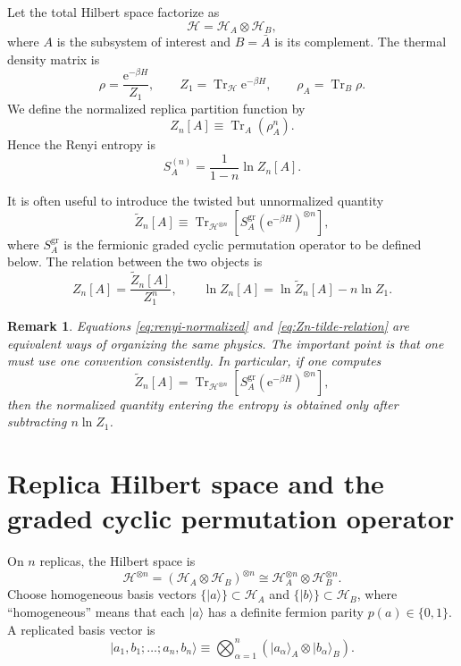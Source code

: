 \documentclass[11pt]{article}
\newtheorem{remark}{Remark}
\newcommand{\Tr}{\operatorname{Tr}}
\newcommand{\e}{\mathrm{e}}
\newcommand{\1}{\mathds{1}}
\newcommand{\HA}{\mathcal{H}_A}
\newcommand{\HB}{\mathcal{H}_B}
\newcommand{\HH}{\mathcal{H}}
\newcommand{\br}[1]{\left(#1\right)}
\newcommand{\sq}[1]{\left[#1\right]}
\begin{document}
Let the total Hilbert space factorize as
\begin{equation}
\HH=\HA\otimes \HB,
\label{eq:Hfactor}
\end{equation}
where $A$ is the subsystem of interest and $B=\bar A$ is its complement. The
thermal density matrix is
\begin{equation}
\rho=\frac{\e^{-\beta H}}{Z_1},
\qquad
Z_1=\Tr_{\HH}\e^{-\beta H},
\qquad
\rho_A=\Tr_B\rho.
\label{eq:rho-def}
\end{equation}
We define the normalized replica partition function by
\begin{equation}
Z_n[A]\equiv \Tr_A(\rho_A^n).
\label{eq:Zn-normalized}
\end{equation}
Hence the Renyi entropy is
\begin{equation}
S_A^{(n)}=\frac{1}{1-n}\ln Z_n[A].
\label{eq:renyi-normalized}
\end{equation}

It is often useful to introduce the twisted but unnormalized quantity
\begin{equation}
\widetilde Z_n[A]\equiv
\Tr_{\HH^{\otimes n}}\sq{S_A^{\mathrm{gr}}\br{\e^{-\beta H}}^{\otimes n}},
\label{eq:Zn-unnormalized}
\end{equation}
where $S_A^{\mathrm{gr}}$ is the fermionic graded cyclic permutation operator
to be defined below. The relation between the two objects is
\begin{equation}
Z_n[A]=\frac{\widetilde Z_n[A]}{Z_1^n},
\qquad
\ln Z_n[A]=\ln \widetilde Z_n[A]-n\ln Z_1.
\label{eq:Zn-tilde-relation}
\end{equation}

\begin{remark}
Equations \eqref{eq:renyi-normalized} and \eqref{eq:Zn-tilde-relation} are
equivalent ways of organizing the same physics. The important point is that
one must use one convention consistently. In particular, if one computes
\[
\widetilde Z_n[A]
=
\Tr_{\HH^{\otimes n}}\sq{S_A^{\mathrm{gr}}\br{\e^{-\beta H}}^{\otimes n}},
\]
then the normalized quantity entering the entropy is obtained only after
subtracting $n \ln Z_1$.
\end{remark}

\section{Replica Hilbert space and the graded cyclic permutation operator}

On $n$ replicas, the Hilbert space is
\begin{equation}
\HH^{\otimes n}=(\HA\otimes \HB)^{\otimes n}
\cong
\HA^{\otimes n}\otimes \HB^{\otimes n}.
\label{eq:replica-space}
\end{equation}
Choose homogeneous basis vectors
$\{\lvert a\rangle\}\subset\HA$ and $\{\lvert b\rangle\}\subset\HB$, where
``homogeneous'' means that each $\lvert a\rangle$ has a definite fermion
parity $p(a)\in\{0,1\}$. A replicated basis vector is
\begin{equation}
\lvert a_1,b_1;\dots;a_n,b_n\rangle
\equiv
\bigotimes_{\alpha=1}^n
\br{\lvert a_\alpha\rangle_A\otimes \lvert b_\alpha\rangle_B}.
\label{eq:replicated-basis}
\end{equation}
\end{document}

